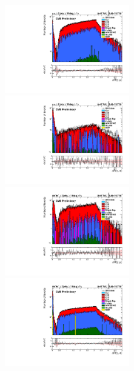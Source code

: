 \documentclass[oneside, a4paper, 11pt, ]{report}
\begin{document}
\begin{figure}
\includegraphics[width=0.5\textwidth]{Plots/ControlPlots/TTbarDiLeptonAnalysis/MuMu/Photons/AllPhotons/Log/Photon_deltaR_muons_splitTTbar_ratio.pdf}
\includegraphics[width=0.5\textwidth]{Plots/ControlPlots/TTbarDiLeptonAnalysis/MuMu/Photons/AllPhotons/Log/Photon_deltaR_electrons_splitTTbar_ratio.pdf}\\
\includegraphics[width=0.5\textwidth]{Plots/ControlPlots/TTbarDiLeptonAnalysis/EE/Photons/AllPhotons/Log/Photon_deltaR_muons_splitTTbar_ratio.pdf}
\includegraphics[width=0.5\textwidth]{Plots/ControlPlots/TTbarDiLeptonAnalysis/EE/Photons/AllPhotons/Log/Photon_deltaR_electrons_splitTTbar_ratio.pdf}\\

\end{figure}
\end{document}
